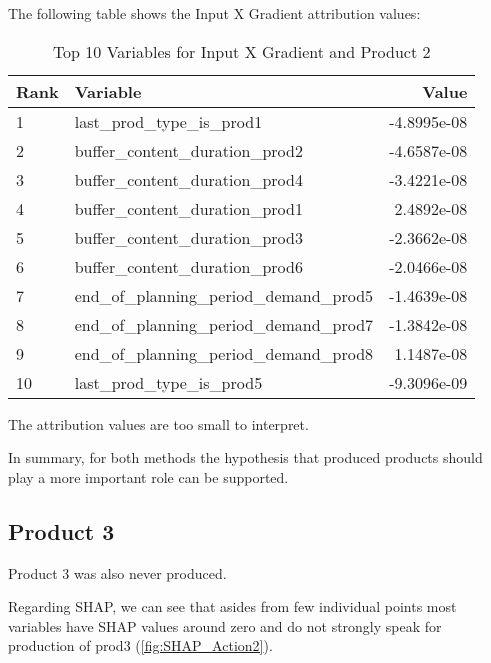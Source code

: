The following table shows the Input X Gradient attribution values:

\begin{table}[ht!]
    \footnotesize
    \centering
    \caption{Top 10 Variables for Input X Gradient and Product 2}
    \label{tab:top_variables_target1}
    \begin{tabularx}{\textwidth}{lXr}
        \toprule
        \textbf{Rank} & \textbf{Variable}                        & \textbf{Value} \\
        \midrule
        1             & last\_prod\_type\_is\_prod1              & -4.8995e-08    \\
        2             & buffer\_content\_duration\_prod2         & -4.6587e-08    \\
        3             & buffer\_content\_duration\_prod4         & -3.4221e-08    \\
        4             & buffer\_content\_duration\_prod1         & 2.4892e-08     \\
        5             & buffer\_content\_duration\_prod3         & -2.3662e-08    \\
        6             & buffer\_content\_duration\_prod6         & -2.0466e-08    \\
        7             & end\_of\_planning\_period\_demand\_prod5 & -1.4639e-08    \\
        8             & end\_of\_planning\_period\_demand\_prod7 & -1.3842e-08    \\
        9             & end\_of\_planning\_period\_demand\_prod8 & 1.1487e-08     \\
        10            & last\_prod\_type\_is\_prod5              & -9.3096e-09    \\
        \bottomrule
    \end{tabularx}
\end{table}
\FloatBarrier

The attribution values are too small to interpret.

In summary, for both methods the hypothesis that produced products should play a more important role can be supported.

\subsection{Product 3}

Product 3 was also never produced.

Regarding SHAP, we can see that asides from few individual points most variables have SHAP values around zero and do not strongly speak for production of prod3 (\ref{fig:SHAP_Action2}).

